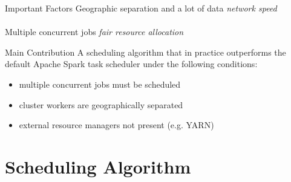\documentclass[presentation,professionalfonts]{beamer}
\begin{document}
\begin{frame}{Important Factors}
  Geographic separation and a lot of data \textrightarrow{} \emph{network speed}
  \\~\\
  Multiple concurrent jobs \textrightarrow{} \emph{fair resource allocation}
\end{frame}

\begin{frame}{Main Contribution}
  A scheduling algorithm that in practice outperforms the default Apache Spark task scheduler under the following conditions:
  \begin{itemize}
  \item multiple concurrent jobs must be scheduled
  \item cluster workers are geographically separated
  \item external resource managers not present (e.g. YARN)
    \end{itemize}
\end{frame}



\section{Scheduling Algorithm}
\end{document}
